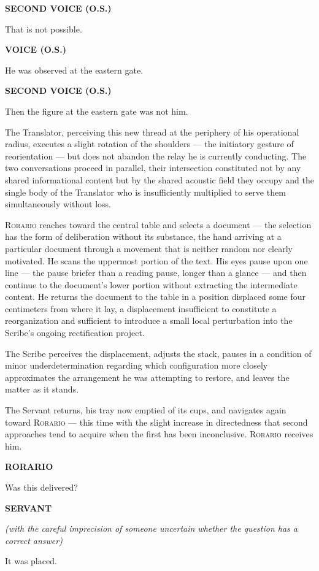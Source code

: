 \documentclass[12pt, oneside]{article}
\newenvironment{action}{%
  \vspace{0.6em}%
  \noindent\ignorespaces%
}{%
  \par\vspace{0.6em}%
}
\newcommand{\character}[1]{%
  \vspace{0.8em}%
  \begin{center}%
    \bfseries\MakeUppercase{#1}%
  \end{center}%
  \vspace{-0.3em}%
}
\newcommand{\paren}[1]{%
  \begin{center}%
    \itshape (#1)%
  \end{center}%
  \vspace{-0.3em}%
}
\newenvironment{dialogue}{%
  \vspace{0.2em}%
  \begin{list}{}{%
    \setlength{\leftmargin}{1.2in}%
    \setlength{\rightmargin}{0.8in}%
    \setlength{\itemsep}{0.6em}%
    \setlength{\parsep}{0pt}%
  }%
}{%
  \end{list}%
  \vspace{0.4em}%
}
\newcommand{\says}[2]{%
  \character{#1}%
  \begin{dialogue}\item #2\end{dialogue}%
}
\newcommand{\saysp}[3]{%
  \character{#1}%
  \paren{#2}%
  \begin{dialogue}\item #3\end{dialogue}%
}
\begin{document}
\says{Second Voice (O.S.)}{That is not possible.}

\says{Voice (O.S.)}{He was observed at the eastern gate.}

\says{Second Voice (O.S.)}{Then the figure at the eastern gate was not him.}

\begin{action}
The Translator, perceiving this new thread at the periphery of his operational radius, executes a slight rotation of the shoulders --- the initiatory gesture of reorientation --- but does not abandon the relay he is currently conducting. The two conversations proceed in parallel, their intersection constituted not by any shared informational content but by the shared acoustic field they occupy and the single body of the Translator who is insufficiently multiplied to serve them simultaneously without loss.

\textsc{Rorario} reaches toward the central table and selects a document --- the selection has the form of deliberation without its substance, the hand arriving at a particular document through a movement that is neither random nor clearly motivated. He scans the uppermost portion of the text. His eyes pause upon one line --- the pause briefer than a reading pause, longer than a glance --- and then continue to the document's lower portion without extracting the intermediate content. He returns the document to the table in a position displaced some four centimeters from where it lay, a displacement insufficient to constitute a reorganization and sufficient to introduce a small local perturbation into the Scribe's ongoing rectification project.

The Scribe perceives the displacement, adjusts the stack, pauses in a condition of minor underdetermination regarding which configuration more closely approximates the arrangement he was attempting to restore, and leaves the matter as it stands.
\end{action}

\begin{action}
The Servant returns, his tray now emptied of its cups, and navigates again toward \textsc{Rorario} --- this time with the slight increase in directedness that second approaches tend to acquire when the first has been inconclusive. \textsc{Rorario} receives him.
\end{action}

\says{Rorario}{Was this delivered?}

\saysp{Servant}{with the careful imprecision of someone uncertain whether the question has a correct answer}{It was placed.}
\end{document}
